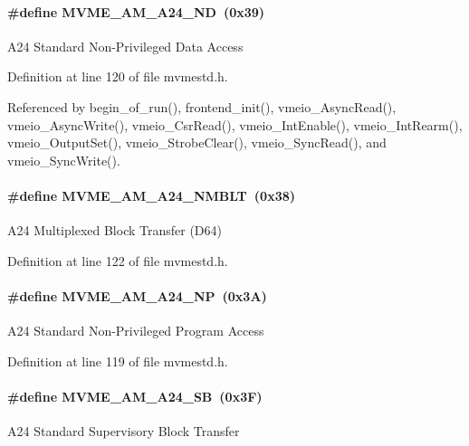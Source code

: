 \paragraph[{MVME\_\-AM\_\-A24\_\-ND}]{\setlength{\rightskip}{0pt plus 5cm}\#define MVME\_\-AM\_\-A24\_\-ND~(0x39)}\hfill\label{group__mvmestdinclude_ga803ae58eabffb7258a6b07843c6c2523}
A24 Standard Non-\/Privileged Data Access 

Definition at line 120 of file mvmestd.h.

Referenced by begin\_\-of\_\-run(), frontend\_\-init(), vmeio\_\-AsyncRead(), vmeio\_\-AsyncWrite(), vmeio\_\-CsrRead(), vmeio\_\-IntEnable(), vmeio\_\-IntRearm(), vmeio\_\-OutputSet(), vmeio\_\-StrobeClear(), vmeio\_\-SyncRead(), and vmeio\_\-SyncWrite().
\paragraph[{MVME\_\-AM\_\-A24\_\-NMBLT}]{\setlength{\rightskip}{0pt plus 5cm}\#define MVME\_\-AM\_\-A24\_\-NMBLT~(0x38)}\hfill\label{group__mvmestdinclude_ga7b46ba6108b0d9b5248318ca29e9df95}
A24 Multiplexed Block Transfer (D64) 

Definition at line 122 of file mvmestd.h.
\paragraph[{MVME\_\-AM\_\-A24\_\-NP}]{\setlength{\rightskip}{0pt plus 5cm}\#define MVME\_\-AM\_\-A24\_\-NP~(0x3A)}\hfill\label{group__mvmestdinclude_ga330662e4b7f7f421c8c12c9ec63128e3}
A24 Standard Non-\/Privileged Program Access 

Definition at line 119 of file mvmestd.h.
\paragraph[{MVME\_\-AM\_\-A24\_\-SB}]{\setlength{\rightskip}{0pt plus 5cm}\#define MVME\_\-AM\_\-A24\_\-SB~(0x3F)}\hfill\label{group__mvmestdinclude_gafb3974875e67dd56677d8827da813aed}
A24 Standard Supervisory Block Transfer 

